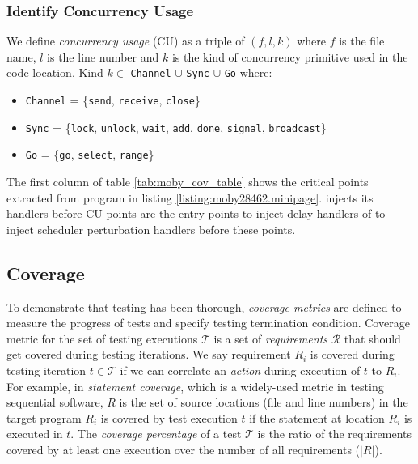 \subsubsection{Identify Concurrency Usage}
We define \textit{concurrency usage} (CU) as a triple of $(f,l,k)$ where $f$ is the file name, $l$ is the line number and $k$ is the kind of concurrency primitive used in the code location.
Kind $k\in$ \texttt{Channel} $\cup$ \texttt{Sync} $\cup$ \texttt{Go} where:
\begin{itemize}
  \item \texttt{Channel} = \{\texttt{send}, \texttt{receive}, \texttt{close}\}
  \item \texttt{Sync} = \{\texttt{lock}, \texttt{unlock}, \texttt{wait}, \texttt{add}, \texttt{done}, \texttt{signal}, \texttt{broadcast}\}
  \item \texttt{Go} = \{\texttt{go}, \texttt{select}, \texttt{range}\}
\end{itemize}

The first column of table \ref{tab:moby_cov_table} shows the critical points extracted from program in listing \ref{listing:moby28462.minipage}.
%
\goat injects its handlers before CU points are the entry points to inject delay handlers of \goat to inject scheduler perturbation handlers before these points.

\subsection{Coverage}
\label{sec:coverage}
To demonstrate that testing has been thorough, \textit{coverage metrics} are defined to measure the progress of tests and specify testing termination condition.
%
Coverage metric for the set of testing executions $\mathcal{T}$ is a set of \textit{requirements} $\mathcal{R}$ that should get covered during testing iterations.
%
We say requirement $R_i$ is covered during testing iteration $t \in \mathcal{T}$ if we can correlate an \textit{action} during execution of $t$ to $R_i$.
%
For example, in \textit{statement coverage}, which is a widely-used metric in testing sequential software, $R$ is the set of source locations (file and line numbers) in the target program
%
$R_i$ is covered by test execution $t$ if the statement at location $R_i$ is executed in $t$.
%
The \textit{coverage percentage} of a test $\mathcal{T}$ is the ratio of the requirements covered by at least one execution over the number of all requirements ($|R|$).

